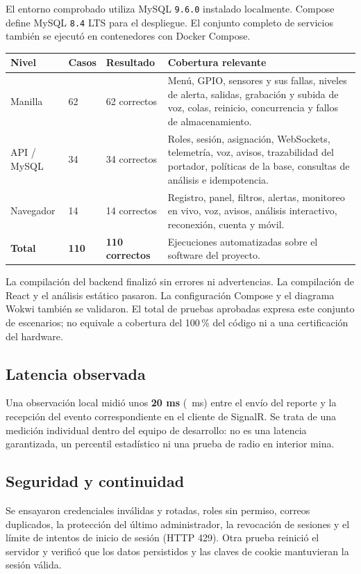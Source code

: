 \documentclass[10pt,a4paper]{article}
\newcommand{\code}[1]{{\small\urlstyle{tt}\nolinkurl{#1}}}
\begin{document}
El entorno comprobado utiliza MySQL \code{9.6.0} instalado localmente. Compose define MySQL \code{8.4} LTS para el despliegue. El conjunto completo de servicios también se ejecutó en contenedores con Docker Compose.

\label{tab:pruebas}
\begin{tabularx}{\linewidth}{@{}P{27mm}P{24mm}P{22mm}Y@{}}
\toprule\textbf{Nivel} & \textbf{Casos} & \textbf{Resultado} & \textbf{Cobertura relevante}\\\midrule
Manilla & 62 & 62 correctos & Menú, GPIO, sensores y sus fallas, niveles de alerta, salidas, grabación y subida de voz, colas, reinicio, concurrencia y fallos de almacenamiento.\\
API / MySQL & 34 & 34 correctos & Roles, sesión, asignación, WebSockets, telemetría, voz, avisos, trazabilidad del portador, políticas de la base, consultas de análisis e idempotencia.\\
Navegador & 14 & 14 correctos & Registro, panel, filtros, alertas, monitoreo en vivo, voz, avisos, análisis interactivo, reconexión, cuenta y móvil.\\\midrule
\textbf{Total} & \textbf{110} & \textbf{110 correctos} & Ejecuciones automatizadas sobre el software del proyecto.\\\bottomrule
\end{tabularx}

La compilación del backend finalizó sin errores ni advertencias. La compilación de React y el análisis estático pasaron. La configuración Compose y el diagrama Wokwi también se validaron. El total de pruebas aprobadas expresa este conjunto de escenarios; no equivale a cobertura del 100\,\% del código ni a una certificación del hardware.

\subsection{Latencia observada}

Una observación local midió unos \textbf{20 ms} (\LatenciaLocal\ ms) entre el envío del reporte y la recepción del evento correspondiente en el cliente de SignalR. Se trata de una medición individual dentro del equipo de desarrollo: no es una latencia garantizada, un percentil estadístico ni una prueba de radio en interior mina.

\subsection{Seguridad y continuidad}
Se ensayaron credenciales inválidas y rotadas, roles sin permiso, correos duplicados, la protección del último administrador, la revocación de sesiones y el límite de intentos de inicio de sesión (HTTP 429). Otra prueba reinició el servidor y verificó que los datos persistidos y las claves de cookie mantuvieran la sesión válida.
\end{document}
